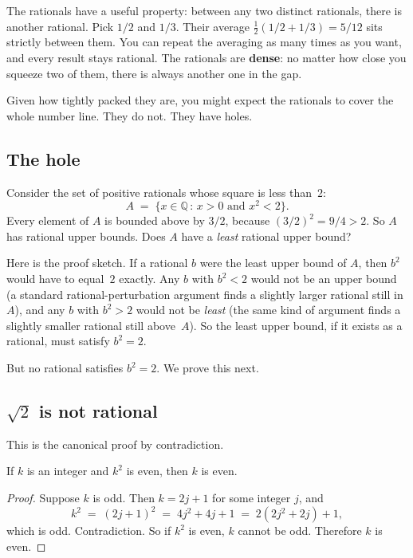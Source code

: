 The rationals have a useful property: between any two distinct rationals, there is another rational. Pick $1/2$ and $1/3$. Their average $\tfrac{1}{2}(1/2 + 1/3) = 5/12$ sits strictly between them. You can repeat the averaging as many times as you want, and every result stays rational. The rationals are \textbf{dense}: no matter how close you squeeze two of them, there is always another one in the gap.

Given how tightly packed they are, you might expect the rationals to cover the whole number line. They do not. They have holes.

\subsection*{The hole}

Consider the set of positive rationals whose square is less than~$2$:
\[
  A \;=\; \{x \in \mathbb{Q} \,:\, x > 0 \text{ and } x^2 < 2\}.
\]
Every element of $A$ is bounded above by $3/2$, because $(3/2)^2 = 9/4 > 2$. So $A$ has rational upper bounds. Does $A$ have a \emph{least} rational upper bound?

Here is the proof sketch. If a rational $b$ were the least upper bound of $A$, then $b^2$ would have to equal~$2$ exactly. Any $b$ with $b^2 < 2$ would not be an upper bound (a standard rational-perturbation argument finds a slightly larger rational still in $A$), and any $b$ with $b^2 > 2$ would not be \emph{least} (the same kind of argument finds a slightly smaller rational still above~$A$). So the least upper bound, if it exists as a rational, must satisfy $b^2 = 2$.

But no rational satisfies $b^2 = 2$. We prove this next.

\subsection*{$\sqrt{2}$ is not rational}

This is the canonical proof by contradiction.

\begin{lemma}
If $k$ is an integer and $k^2$ is even, then $k$ is even.
\end{lemma}

\begin{proof}
Suppose $k$ is odd. Then $k = 2j + 1$ for some integer $j$, and
\[
  k^2 \;=\; (2j+1)^2 \;=\; 4j^2 + 4j + 1 \;=\; 2(2j^2 + 2j) + 1,
\]
which is odd. Contradiction. So if $k^2$ is even, $k$ cannot be odd. Therefore $k$ is even.
\end{proof}

